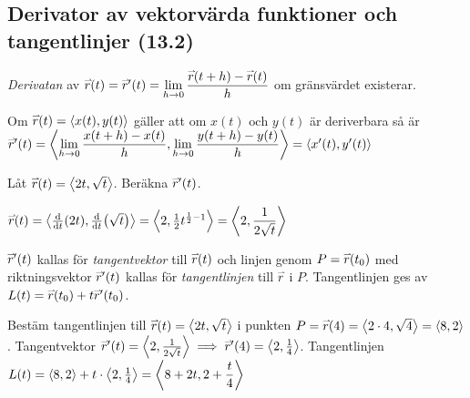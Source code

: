 \documentclass[a4paper]{article}
\begin{document}
\subsection{Derivator av vektorvärda funktioner och tangentlinjer (13.2)}
\begin{defn}
    \emph{Derivatan} av \(
        \accentset{\rightharpoonup}{r} (t) = \accentset{\rightharpoonup}{r}'(t) = \displaystyle\lim_{h\to  0} \displaystyle\frac{\accentset{\rightharpoonup}{r} (t+h) - \accentset{\rightharpoonup}{r}(t) }{h}   
    \) om gränsvärdet existerar.
\end{defn}

Om \(
    \accentset{\rightharpoonup}{r} (t) = \left\langle x(t), y(t)\right\rangle
\) gäller att om \(
    x(t) \text{ och } y(t)
\) är deriverbara så är \(
    \accentset{\rightharpoonup}{r}' (t) = \left\langle \displaystyle\lim_{h\to  0} \displaystyle\frac{x(t+h) - x(t) }{h}, \displaystyle\lim_{h\to  0} \displaystyle\frac{y(t+h) - y(t) }{h}\right\rangle
    = \left\langle x'(t), y'(t)\right\rangle
\) 

\begin{ex}
    Låt \(
        \accentset{\rightharpoonup}{r} (t) = \left\langle 2t, \sqrt{t}\right\rangle
    \). Beräkna \(
        \accentset{\rightharpoonup}{r} '(t)
    \).
\end{ex}
\(
    \accentset{\rightharpoonup}{r} (t) = \left\langle \dv{t} (2t), \dv{t} (\sqrt{t}) \right\rangle 
    = \left\langle 2, \frac{1}{2} t^{\frac{1}{2}-1} \right\rangle 
    = \left\langle 2, \displaystyle\frac{1}{2 \sqrt{t}} \right\rangle
\) 

\begin{defn}
    \(
        \accentset{\rightharpoonup}{r}'(t)
    \) kallas för \emph{tangentvektor} till \(
        \accentset{\rightharpoonup}{r}(t)
    \) och linjen genom \(
        P = \accentset{\rightharpoonup}{r} (t_0)
    \) med riktningsvektor \(
        \accentset{\rightharpoonup}{r} '(t) 
    \) kallas för \emph{tangentlinjen} till \(
        \accentset{\rightharpoonup}{r} 
    \) i \(
        P
    \).
    Tangentlinjen ges av \(
    L(t) = \accentset{\rightharpoonup}{r} (t_0) + t \accentset{\rightharpoonup}{r} '(t_0)
\).
\end{defn}

\begin{ex}
    Bestäm tangentlinjen till \(
        \accentset{\rightharpoonup}{r} (t) = \left\langle 2t, \sqrt{t} \right\rangle
    \) i punkten \(
        P = \accentset{\rightharpoonup}{r} (4) = \left\langle 2 \cdot 4, \sqrt{4} \right\rangle
        = \left\langle 8, 2 \right\rangle
    \). Tangentvektor \(
        \accentset{\rightharpoonup}{r} '(t) = \left\langle 2, \frac{1}{2 \sqrt t} \right\rangle
        \implies \accentset{\rightharpoonup}{r} '(4) = \left\langle 2, \frac{1}{4} \right\rangle
    \). Tangentlinjen \(
        L(t) = \left\langle 8, 2 \right\rangle + t \cdot \left\langle 2, \frac{1}{4} \right\rangle 
        = \left\langle 8 + 2t, 2 + \displaystyle\frac{t}{4} \right\rangle
    \) 
\end{ex}
\end{document}
